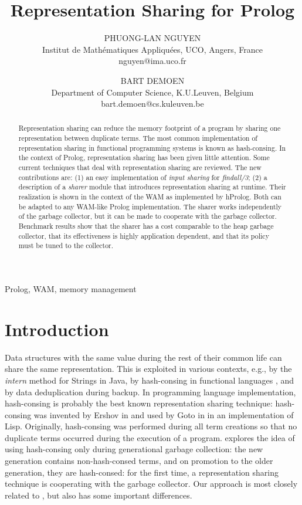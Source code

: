 \documentclass{tlp}
\title[Representation Sharing for Prolog]{Representation Sharing for Prolog}
\author[Phuong-Lan Nguyen and Bart Demoen]
{
PHUONG-LAN NGUYEN\\
Institut de Math\'ematiques Appliqu\'ees, UCO, Angers, France \\
nguyen@ima.uco.fr
\and 
BART DEMOEN\\
Department of Computer Science, K.U.Leuven, Belgium\\
bart.demoen@cs.kuleuven.be
}
\begin{document}
\date{}
\maketitle



\begin{abstract}
Representation sharing can reduce the memory footprint of a program by
sharing one representation between duplicate terms. The most
common implementation of representation sharing in functional
programming systems is known as hash-consing. In the context of
Prolog, representation sharing has been given little attention. Some
current techniques that deal with representation sharing are
reviewed. The new contributions are: (1) an easy implementation of
{\em input sharing} for {\em findall/3}; (2) a description of a {\em sharer}
module that introduces representation sharing at runtime. Their
realization is shown in the context of the WAM as implemented by
hProlog. Both can be adapted to any WAM-like Prolog
implementation. The sharer works independently of the garbage
collector, but it can be made to cooperate with the garbage
collector. Benchmark results show that the sharer has a cost
comparable to the heap garbage collector, that its effectiveness is
highly application dependent, and that its policy must be tuned to the
collector.
\end{abstract}
  \begin{keywords}
  Prolog, WAM, memory management
  \end{keywords}









\section{Introduction}\label{intro}

Data structures with the same value during the rest of their common
life can share the same representation. This is exploited in various
contexts, e.g., by the {\em intern} method for Strings in Java, by
hash-consing in functional languages \cite{goto74}, and by
data deduplication during backup. In programming language
implementation, hash-consing is probably the best known representation
sharing technique: hash-consing was invented by Ershov in
\cite{ershov58} and used by Goto in \cite{goto74} in an implementation
of Lisp. Originally, hash-consing was performed during all term
creations so that no duplicate terms occurred during the execution of
a program. \cite{appelhashconsinggc} explores the idea of using
hash-consing only during generational garbage collection: the new
generation contains non-hash-consed terms, and on promotion to the
older generation, they are hash-consed: for the first time, a
representation sharing technique is cooperating with the garbage
collector. Our approach is most closely related to
\cite{appelhashconsinggc}, but also has some important differences.
\end{document}

